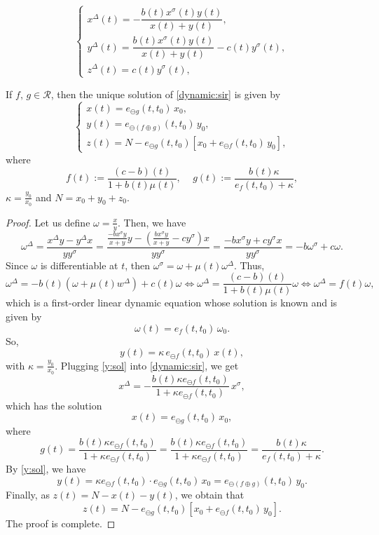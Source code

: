 \documentclass[10pt,a4paper]{amsart}
\begin{document}
\begin{equation}
\label{dynamic:sir}
\begin{cases}
x^\Delta(t) = -\dfrac{b(t)x^\sigma(t)y(t)}{x(t)+y(t)},\\
y^\Delta(t) = \dfrac{b(t)x^\sigma(t)y(t)}{x(t)+y(t)} - c(t)y^\sigma(t),\\
z^\Delta(t) = c(t)y^\sigma(t),
\end{cases}	
\end{equation}

\begin{theorem}
\label{thm:6}
If $f,\, g \in \mathcal{R}$, then the unique solution of 
\eqref{dynamic:sir} is given by
\begin{equation}
\label{dynamic:solution}
\begin{cases}
x(t) = e_{\ominus g} (t,t_0)\,x_0,\\
y(t) = e_{\ominus \left(f \oplus g\right)}(t,t_0)\,y_0,\\
z(t) = N - e_{\ominus g}(t,t_0)\left[x_0 + e_{\ominus f}(t,t_0)\,y_0\right],
\end{cases}
\end{equation}
where 
\begin{equation}
\label{eq:f:g}
f(t):= \frac{(c-b)(t)}{1 + b(t)\mu(t)},\,\quad g(t) 
:= \frac{b(t)\kappa}{e_f(t,t_0) + \kappa},
\end{equation}
$\kappa = \frac{y_0}{x_0}$ and $N = x_0 + y_0 + z_0$.
\end{theorem}

\begin{proof}
Let us define $\omega = \frac{x}{y}$. Then, we have
$$
\omega^\Delta = \frac{x^\Delta y - y^\Delta x}{yy^\sigma}
= \frac{\frac{-bx^\sigma y}{x + y}y - \left(\frac{bx^\sigma y}{x+y} 
- cy^\sigma\right)x}{yy^\sigma}
= \frac{-bx^\sigma y + cy^\sigma x}{yy^\sigma}
= -b\omega^\sigma + c\omega.
$$
Since $\omega$ is differentiable at $t$, then 
$\omega^\sigma = \omega + \mu(t) \omega^\Delta$. Thus, 
$$
\omega^\Delta = -b(t)(\omega + \mu(t)w^\Delta) + c(t)\omega 
\Leftrightarrow \omega^\Delta = \frac{(c-b)(t)}{1 + b(t)\mu(t)}\omega
\Leftrightarrow \omega^\Delta = f(t) \omega, 
$$
which is a first-order linear dynamic equation whose solution is known
and is given by
$$
\omega(t) = e_{f}(t,t_0)\,\omega_0. 
$$
So, 
\begin{equation}
\label{y:sol}
y(t) = \kappa\, e_{\ominus f}(t,t_0)\,x(t),
\end{equation}
with $\kappa = \frac{y_0}{x_0}$. 
Plugging \eqref{y:sol} into \eqref{dynamic:sir}, we get
$$
x^\Delta = -\frac{b(t)\kappa e_{\ominus f}(t,t_0)}
{1 + \kappa e_{\ominus f}(t,t_0)}\,x^\sigma,
$$
which has the solution
$$
x(t) = e_{\ominus g}(t,t_0)\,x_0,
$$
where 
$$
g(t)= \frac{b(t)\kappa e_{\ominus f}(t,t_0)}
{1 + \kappa e_{\ominus f}(t,t_0)}
= \frac{b(t)\kappa e_{\ominus f}(t,t_0)}{1 + \kappa e_{\ominus f}(t,t_0)}
= \frac{b(t)\kappa}{e_f(t,t_0) + \kappa}.
$$
By \eqref{y:sol}, we have 
$$
y(t) = \kappa e_{\ominus f}(t,t_0)\cdot
e_{\ominus g}(t,t_0)\, x_0 = e_{\ominus(f \oplus g)}(t,t_0)\,y_0.
$$
Finally, as $z(t) = N - x(t) - y(t)$, we obtain that
$$
z(t) = N - e_{\ominus g}(t,t_0)\left[x_0 + e_{\ominus f}(t,t_0)\,y_0\right].
$$
The proof is complete. 
\end{proof}
\end{document}
